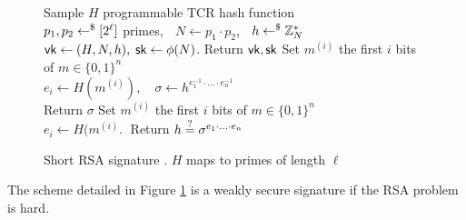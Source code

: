 \begin{figure}[htb]
\centering
\begin{pcvstack}
		{
			Sample $H$ programmable TCR hash function
				\\
			$p_1, p_2 \gets^{\$} {[2^\ell]}$ primes, $\;$ $N \gets p_1 \cdot p_2$, $\;$ $h \gets^{\$} \mathbb{Z}_N^\ast$
				\\
			$\vk \gets (H, N, h), \; \sk \gets \phi(N)$. Return $\vk, \sk$
		}
		{
			Set $m^{(i)}$ the first $i$ bits of $m \in \{0, 1\}^n$
				\\
			$e_i \gets H(m^{(i)}), \quad \sigma \gets h^{e_1^{-1} \cdot \ldots \cdot e_n^{-1}}$
				\\
			Return $\sigma$
		}
		{
			Set $m^{(i)}$ the first $i$ bits of $m \in \{0, 1\}^n$
				\\
			$e_i \gets H(m^{(i)}. \;$ Return $h \stackrel{?}{=} \sigma^{e_1 \cdot \ldots \cdot e_n}$
		}
\end{pcvstack}
\label{prot:HohWat09}
\caption{Short RSA signature \cite{C:HohWat09}. $H$ maps to primes of length $\ell$}
\end{figure}

\begin{proposition}
	\label{prop:HohWat09}
	The scheme detailed in Figure \ref{prot:HohWat09} is a weakly secure signature if the RSA problem is hard.
\end{proposition}
